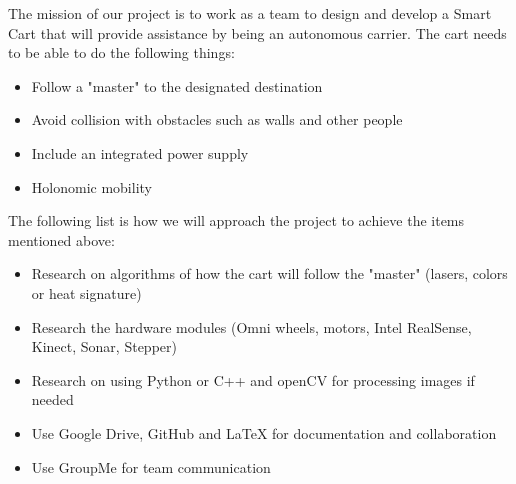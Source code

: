 The mission of our project is to work as a team to design and develop a Smart Cart that will provide assistance by being an autonomous carrier. The cart needs to be able to do the following things: 
\begin{itemize}
	\item Follow a "master" to the designated destination
	\item Avoid collision with obstacles such as walls and other people
	\item Include an integrated power supply
	\item Holonomic mobility
\end{itemize}

The following list is how we will approach the project to achieve the items mentioned above:
\begin{itemize}
	\item Research on algorithms of how the cart will follow the "master" (lasers, colors or heat signature)
	\item Research the hardware modules (Omni wheels, motors, Intel RealSense, Kinect, Sonar, Stepper)
	\item Research on using Python or C++ and openCV for processing images if needed
	\item Use Google Drive, GitHub and LaTeX for documentation and collaboration
	\item Use GroupMe for team communication
\end{itemize}